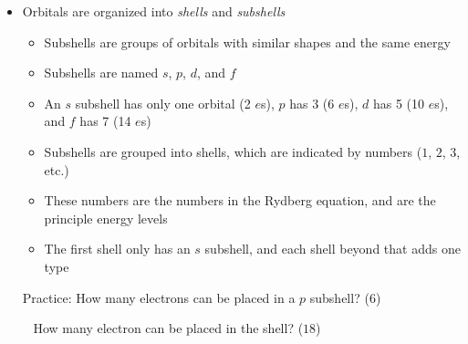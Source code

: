 \documentclass[12pt, openany, letterpaper]{memoir}
\begin{document}
\begin{itemize}
\begin{itemize}
	      \end{itemize}
	\item Orbitals are organized into \emph{shells} and \emph{subshells}
	      \begin{itemize}
		      \item Subshells are groups of orbitals with similar shapes and the same energy
		      \item Subshells are named $s$, $p$, $d$, and $f$
		      \item An $s$ subshell has only one orbital (2 $e$s), $p$ has 3 (6 $e$s), $d$ has 5 (10 $e$s), and $f$ has 7 (14 $e$s)
		      \item Subshells are grouped into shells, which are indicated by numbers ($1$, $2$, $3$, etc.)
		      \item These numbers are the numbers in the Rydberg equation, and are the principle energy levels
		      \item The first shell only has an $s$ subshell, and each shell beyond that adds one type
	      \end{itemize}
	      Practice: How many electrons can be placed in a $p$ subshell? ($6$)

	      ~\hphantom{Practice:} How many electron can be placed in the  shell? ($18$)


\end{itemize}
\end{document}
